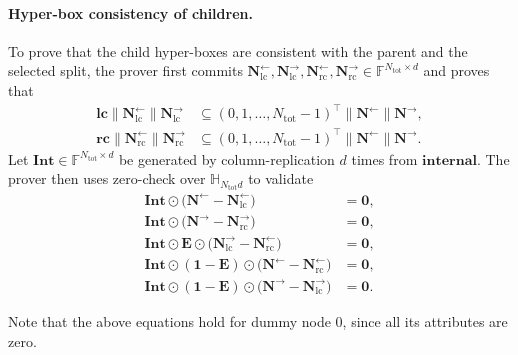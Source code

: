 \paragraph{Hyper-box consistency of children.}
To prove that the child hyper-boxes are consistent with the parent and the selected split,
    the prover first commits
    $\mathbf{N}^{\leftarrow}_{\mathrm{lc}}, \mathbf{N}^{\rightarrow}_{\mathrm{lc}},
    \mathbf{N}^{\leftarrow}_{\mathrm{rc}}, \mathbf{N}^{\rightarrow}_{\mathrm{rc}}
    \in \mathbb{F}^{N_{\mathrm{tot}}\times d}$
    and proves that
    \begin{align}
        \mathbf{lc}\| \mathbf{N}^{\leftarrow}_{\mathrm{lc}}\| \mathbf{N}^{\rightarrow}_{\mathrm{lc}}
        &\subseteq
        (0, 1, \dots, N_{\mathrm{tot}}-1)^\top\| \mathbf{N}^{\leftarrow}\| \mathbf{N}^{\rightarrow},\\
        \mathbf{rc}\| \mathbf{N}^{\leftarrow}_{\mathrm{rc}}\| \mathbf{N}^{\rightarrow}_{\mathrm{rc}}
        &\subseteq
        (0, 1, \dots, N_{\mathrm{tot}}-1)^\top\| \mathbf{N}^{\leftarrow}\| \mathbf{N}^{\rightarrow}.
    \end{align}
    Let $\mathbf{Int}\in\mathbb{F}^{N_{\mathrm{tot}}\times d}$ be generated by
    column-replication $d$ times from $\mathbf{internal}$.
    The prover then uses zero-check over $\mathbb{H}_{N_{\mathrm{tot}}d}$ to validate
    \begin{align}
        \mathbf{Int}\odot\bigl(\mathbf{N}^{\leftarrow}-\mathbf{N}^{\leftarrow}_{\mathrm{lc}}\bigr) &= \mathbf{0},\\
        \mathbf{Int}\odot\bigl(\mathbf{N}^{\rightarrow}-\mathbf{N}^{\rightarrow}_{\mathrm{rc}}\bigr) &= \mathbf{0},\\
        \mathbf{Int}\odot\mathbf{E}\odot
        \bigl(\mathbf{N}^{\rightarrow}_{\mathrm{lc}}-\mathbf{N}^{\leftarrow}_{\mathrm{rc}}\bigr) &= \mathbf{0},\\
        \mathbf{Int}\odot(\mathbf{1}-\mathbf{E})\odot
        \bigl(\mathbf{N}^{\leftarrow}-\mathbf{N}^{\leftarrow}_{\mathrm{rc}}\bigr) &= \mathbf{0},\\
        \mathbf{Int}\odot(\mathbf{1}-\mathbf{E})\odot
        \bigl(\mathbf{N}^{\rightarrow}-\mathbf{N}^{\rightarrow}_{\mathrm{lc}}\bigr) &= \mathbf{0}.
    \end{align}

    Note that the above equations hold for dummy node $0$,
    since all its attributes are zero.


